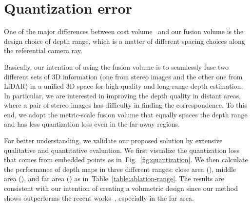\documentclass[letterpaper, 10 pt, conference]{ieeeconf}
\newcommand{\Tref}[1]{Table~\textcolor{blue}{\ref{#1}}}
\newcommand{\Fref}[1]{Fig.~\textcolor{blue}{\ref{#1}}}
\begin{document}
\section{Quantization error}
\label{supp-sec:Quantization error}
One of the major differences between cost volume~\cite{psmnet,gcnet,ganet} and our fusion volume is the design choice of depth range, which is a matter of different spacing choices along the referential camera ray.

Basically, our intention of using the fusion volume is to seamlessly fuse two different sets of  3D information (one from stereo images and the other one from LiDAR) in a unified 3D space for high-quality and long-range depth estimation. 
In particular, we are interested in improving the depth quality in distant areas, where a pair of stereo images has difficulty in finding the correspondence. To this end, we adopt the metric-scale fusion volume that equally spaces the depth range and has less quantization loss even in the far-away regions.

For better understanding, we validate our proposed solution by extensive qualitative and quantitative evaluation. We first visualize the quantization loss that comes from embedded points as in~\Fref{fig:quantization}. We then calculate the performance of depth maps in three different ranges: close area (), middle area (), and far area () as in~\Tref{table:ablation-range}. The results are consistent with our intention of creating a volumetric design since our method shows outperforms the recent works~\cite{stereolidar_00,stereolidar_01,stereolidar_norm_costV_ccvn}, especially in the far area. 
\end{document}
